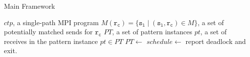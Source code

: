 
\begin{algorithm}
\caption{Main Framework}\label{algo:main}
\begin{algorithmic}[1]
\Require $\mathit{ctp}$, a single-path MPI program
\Require $\mathit{M}(\mathtt{r_c}) = \{\mathtt{s_l}\mid(\mathtt{s_l},\mathtt{r_c})\in\mathit{M}\}$, a set of potentially matched sends for $\mathtt{r_c}$
\State  $\mathit{PT}$, a set of pattern instances
\State  $\mathit{pt}$, a set of receives in the pattern instance $\mathit{pt}\in\mathit{PT}$
\State  $\mathit{PT} \gets$ 
\State $\mathit{schedule} \gets$  
\State report deadlock and exit.
\EndIf
\EndIf

\EndFor
\end{algorithmic}
\end{algorithm}

